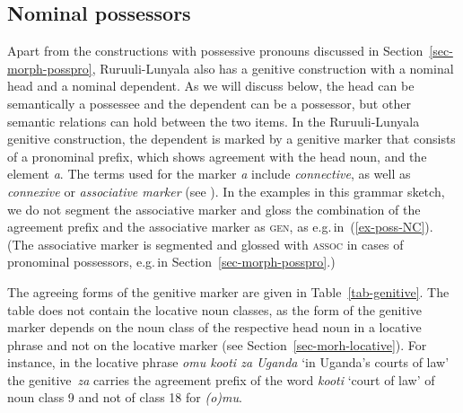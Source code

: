 	
\subsection{Nominal possessors}\label{sec-NP-genitive}

Apart from the constructions with possessive pronouns discussed in Section~\ref{sec-morph-posspro}, Ru\-ruu\-li\hyp{}Lu\-nya\-la also has a genitive construction with a nominal head and a nominal dependent. 
As we will discuss below, the head can be semantically a possessee and the dependent can be a possessor, but other semantic relations can hold between the two items.
In the Ru\-ruu\-li\hyp{}Lu\-nya\-la genitive construction, the dependent is marked by a genitive marker that consists of a pronominal prefix, which shows agreement with the head noun, and the element \emph{a}. The terms used for the marker \emph{a} include \emph{connective}, as well as \emph{connexive} or \emph{associative marker} (see \citealt{Vandeveldeetal2019Nominal}). 
In the examples in this grammar sketch, we do not segment the associative marker and gloss the combination of the agreement prefix and the associative marker as \textsc{gen}, as e.g.\,in~(\ref{ex-poss-NC}). (The associative marker is segmented and glossed with \textsc{assoc} in cases of pronominal possessors, e.g.\,in Section~\ref{sec-morph-posspro}.)
 
The agreeing forms of the genitive marker are given in Table~\ref{tab-genitive}. 
The table does not contain the locative noun classes, as the form of the genitive marker depends on the noun class of the respective head noun in a locative phrase and not on the locative marker (see Section~\ref{sec-morh-locative}). 
For instance, in the locative phrase \emph{omu kooti za Uganda} `in Uganda's courts of law' the genitive \emph{za} carries the agreement prefix of the word \emph{kooti} `court of law' of noun class 9 and not of class 18 for \emph{(o)mu}.

